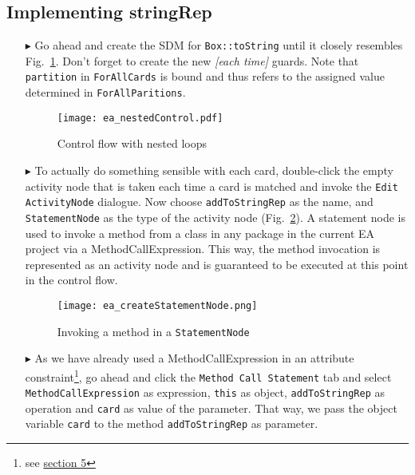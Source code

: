\newpage
\hypertarget{stringRep vis}{}
\subsection{Implementing stringRep}
\visHeader

\begin{itemize}

\item[$\blacktriangleright$] Go ahead and create the SDM for \texttt{Box::toString} until it closely resembles Fig.~\ref{fig:sdm_tostring_1}. Don't forget to
create the new \emph{[each time]} guards. Note that \texttt{partition} in \texttt{ForAllCards} is bound  and thus refers to the assigned value determined in
\texttt{ForAllParitions}.

\begin{figure}[htbp]
\begin{center}
  \texttt{[image: ea\_nestedControl.pdf]}
  \caption{Control flow with nested loops} 
  \label{fig:sdm_tostring_1}
\end{center}
\end{figure}


\item[$\blacktriangleright$] To actually do something sensible with each card, double-click the empty activity node that is taken each time a card is matched and invoke the \texttt{Edit
ActivityNode} dialogue. Now choose \texttt{addToStringRep} as the name, and \texttt{StatementNode} as the type of the activity node
(Fig.~\ref{fig:sdm_tostring_2}).  A statement node is used to invoke a method from a class in any package in the current EA project via a
MethodCallExpression. This way, the method invocation is represented as an activity node and is guaranteed to be executed at this point in the control flow.

\begin{figure}[htbp]
\begin{center}
  \texttt{[image: ea\_createStatementNode.png]}
  \caption{Invoking a method in a \texttt{StatementNode}}  
  \label{fig:sdm_tostring_2}
\end{center}
\end{figure}

\item[$\blacktriangleright$] As we have already used a MethodCallExpression in an attribute constraint\footnote{see \hyperlink{sec:growBox}{section 5}}, go
ahead and click the \texttt{Method Call Statement} tab and select \texttt{MethodCallExpression} as expression, \texttt{this} as object, \texttt{addToStringRep} as
operation and \texttt{card} as value of the parameter. That way, we pass the object variable \texttt{card} to the method \texttt{addToStringRep} as parameter.

\end{itemize}

